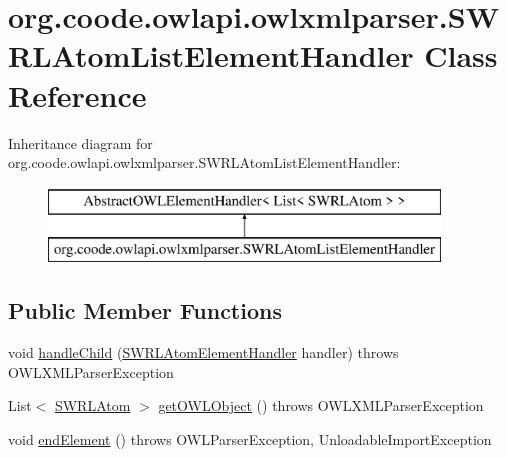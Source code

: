 \hypertarget{classorg_1_1coode_1_1owlapi_1_1owlxmlparser_1_1_s_w_r_l_atom_list_element_handler}{\section{org.\-coode.\-owlapi.\-owlxmlparser.\-S\-W\-R\-L\-Atom\-List\-Element\-Handler Class Reference}
\label{classorg_1_1coode_1_1owlapi_1_1owlxmlparser_1_1_s_w_r_l_atom_list_element_handler}
}
Inheritance diagram for org.\-coode.\-owlapi.\-owlxmlparser.\-S\-W\-R\-L\-Atom\-List\-Element\-Handler\-:\begin{figure}[H]
\begin{center}
\leavevmode
\includegraphics[height=2.000000cm]{classorg_1_1coode_1_1owlapi_1_1owlxmlparser_1_1_s_w_r_l_atom_list_element_handler}
\end{center}
\end{figure}
\subsection*{Public Member Functions}
\begin{DoxyCompactItemize}
\item 
void \hyperlink{classorg_1_1coode_1_1owlapi_1_1owlxmlparser_1_1_s_w_r_l_atom_list_element_handler_aa57c4163c061b09bc8fbdb3b9b3c11f9}{handle\-Child} (\hyperlink{classorg_1_1coode_1_1owlapi_1_1owlxmlparser_1_1_s_w_r_l_atom_element_handler}{S\-W\-R\-L\-Atom\-Element\-Handler} handler)  throws O\-W\-L\-X\-M\-L\-Parser\-Exception 
\item 
List$<$ \hyperlink{interfaceorg_1_1semanticweb_1_1owlapi_1_1model_1_1_s_w_r_l_atom}{S\-W\-R\-L\-Atom} $>$ \hyperlink{classorg_1_1coode_1_1owlapi_1_1owlxmlparser_1_1_s_w_r_l_atom_list_element_handler_a73fb941bb742e351fa6f68aaa2e0718b}{get\-O\-W\-L\-Object} ()  throws O\-W\-L\-X\-M\-L\-Parser\-Exception 
\item 
void \hyperlink{classorg_1_1coode_1_1owlapi_1_1owlxmlparser_1_1_s_w_r_l_atom_list_element_handler_a8df94a74be42310b7f26f38a3882c945}{end\-Element} ()  throws O\-W\-L\-Parser\-Exception, Unloadable\-Import\-Exception 
\end{DoxyCompactItemize}
